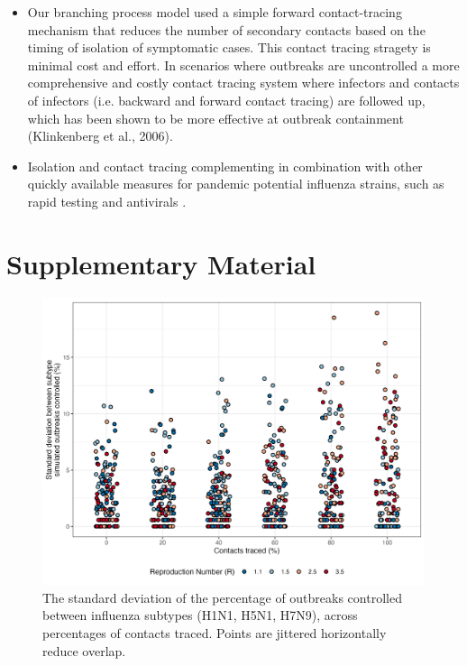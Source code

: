 \documentclass{article}
\begin{document}
\begin{itemize}
\item Our branching process model used a simple forward contact-tracing mechanism that reduces the number of secondary contacts based on the timing of isolation of symptomatic cases. This contact tracing stragety is minimal cost and effort. In scenarios where outbreaks are uncontrolled a more comprehensive and costly contact tracing system where infectors and contacts of infectors (i.e. backward and forward contact tracing) are followed up, which has been shown to be more effective at outbreak containment (Klinkenberg et al., 2006).
\item Isolation and contact tracing complementing in combination with other quickly available measures for pandemic potential influenza strains, such as rapid testing and antivirals \citep{haydenPerspectivesAntiviralUse2001}.
\end{itemize}




\clearpage

\section*{Supplementary Material}

\setcounter{figure}{0}
\renewcommand{\thefigure}{S\arabic{figure}}


\begin{figure}[ht]
\centering
\includegraphics[width=\textwidth]{../plots/prop_outbreak_control_var_reproduction_number.png}
\caption{The standard deviation of the percentage of outbreaks controlled between influenza subtypes (H1N1, H5N1, H7N9), across percentages of contacts traced. Points are jittered horizontally reduce overlap.}
\label{fig:prop-outbreak-control-var-R}
\end{figure}
\end{document}
